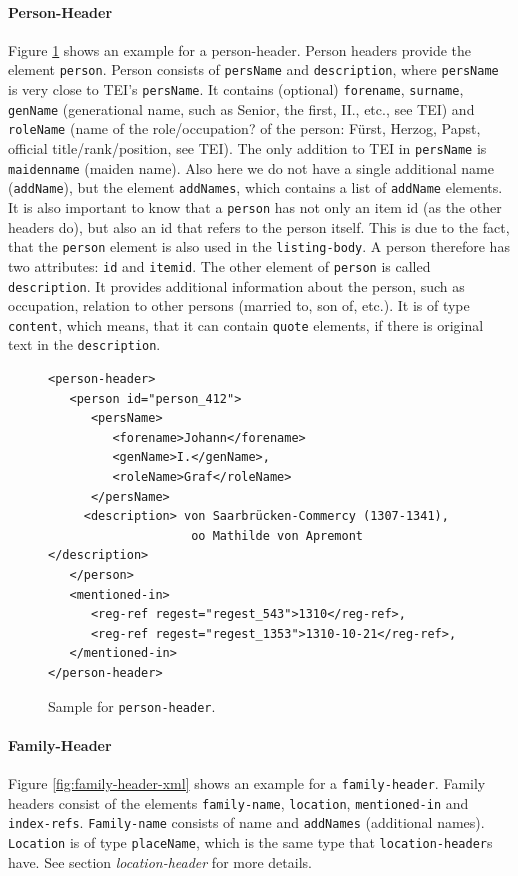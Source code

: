 \paragraph{Person-Header}
Figure \ref{fig:person-header-xml} shows an example for a person-header. Person headers provide the element \texttt{person}. Person consists of \texttt{persName} and \texttt{description}, where \texttt{persName} is very close to TEI's \texttt{persName}. It contains (optional) \texttt{forename}, \texttt{surname}, \texttt{genName} (generational name, such as Senior, the first, II., etc., see TEI) and \texttt{roleName} (name of the role/occupation? of the person: Fürst, Herzog, Papst, official title/rank/position, see TEI). The only addition to TEI in \texttt{persName} is \texttt{maidenname} (maiden name). Also here we do not have a single additional name (\texttt{addName}), but the element \texttt{addNames}, which contains a list of \texttt{addName} elements. It is also important to know that a \texttt{person} has not only an item id (as the other headers do), but also an id that refers to the person itself. This is due to the fact, that the \texttt{person} element is also used in the \texttt{listing-body}. A person therefore has two attributes: \texttt{id} and \texttt{itemid}.
The other element of \texttt{person} is called \texttt{description}. It provides additional information about the person, such as occupation, relation to other persons (married to, son of, etc.). It is of type \texttt{content}, which means, that it can contain \texttt{quote} elements, if there is original text in the \texttt{description}.

\begin{figure}[H]
\begin{verbatim}
<person-header>
   <person id="person_412">
      <persName>
         <forename>Johann</forename> 
         <genName>I.</genName>, 
         <roleName>Graf</roleName>
      </persName>
     <description> von Saarbrücken-Commercy (1307-1341), 
                    oo Mathilde von Apremont    </description>
   </person>
   <mentioned-in>
      <reg-ref regest="regest_543">1310</reg-ref>, 
      <reg-ref regest="regest_1353">1310-10-21</reg-ref>, 
   </mentioned-in>
</person-header>
\end{verbatim}
\label{fig:person-header-xml}
\caption{Sample for \texttt{person-header}.}
\end{figure}

\paragraph{Family-Header}
Figure \ref{fig:family-header-xml} shows an example for a \texttt{family-header}. Family headers consist of the elements \texttt{family-name}, \texttt{location}, \texttt{mentioned-in} and \texttt{index-refs}. \texttt{Family-name} consists of name and \texttt{addNames} (additional names). \texttt{Location} is of type \texttt{placeName}, which is the same type that \texttt{location-header}s have. See section \textit{location-header} for more details.

